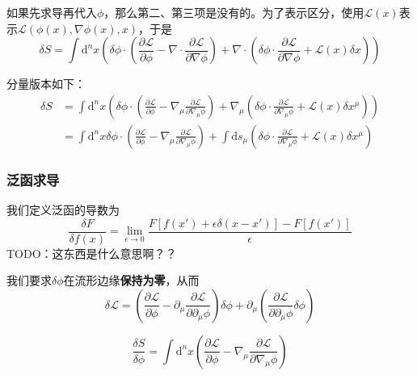 \documentclass[UTF8, a4paper]{ctexart}
\begin{document}
如果先求导再代入$\phi$，那么第二、第三项是没有的。为了表示区分，使用$\mathcal{L}(x)$表示$\mathcal{L}(\phi(x), \nabla \phi (x), x)$，于是
\begin{equation}
    \delta S = \int \mathrm{d}^n x \left( \delta \phi \cdot \left(\frac{\partial \mathcal{L}}{\partial \phi} - \nabla \cdot \frac{\partial \mathcal{L}}{\partial \nabla \phi} \right) + \nabla \cdot \left( \delta \phi \cdot \frac{\partial \mathcal{L}}{\partial \nabla \phi} + \mathcal{L}(x) \delta x \right) \right)
    \label{eq:variation-of-action}
\end{equation}

分量版本如下：
\begin{equation}
    \begin{aligned}
        \delta S &= \int \mathrm{d}^n x \left( \delta \phi \cdot \left ( \frac{\partial \mathcal{L}}{\partial \phi} - \nabla_\mu \frac{\partial \mathcal{L}}{\partial \nabla_\mu \phi} \right) + \nabla_\mu \left( \delta \phi \cdot \frac{\partial \mathcal{L}}{\partial \nabla_\mu \phi} + \mathcal{L}(x) \delta x^\mu\right) \right) \\
        &= \int \mathrm{d}^n x  \delta \phi \cdot \left ( \frac{\partial \mathcal{L}}{\partial \phi} - \nabla_\mu \frac{\partial \mathcal{L}}{\partial \nabla_\mu \phi} \right)
        + \int \mathrm{d}s_\mu \left( \delta \phi \cdot \frac{\partial \mathcal{L}}{\partial \nabla_\mu \phi} + \mathcal{L}(x) \delta x^\mu\right)
    \end{aligned}
\end{equation}

\subsubsection{泛函求导}
我们定义泛函的导数为
\begin{equation}
    \frac{\delta F}{\delta f(x)} = \lim_{\epsilon \to 0} \frac{F[f(x')+\epsilon \delta (x - x')] - F[f(x')]}{\epsilon}
    \label{eq:derivative-of-functional-def}
\end{equation}
TODO：这东西是什么意思啊？？

我们要求$\delta \phi$在流形边缘\textbf{保持为零}，从而
\[
\delta \mathcal{L} = \left( \frac{\partial \mathcal{L}}{\partial \phi} - \partial_\mu \frac{\partial \mathcal{L}}{\partial \partial_\mu \phi} \right) \delta \phi + \partial_\mu \left( \frac{\partial \mathcal{L}}{\partial \partial_\mu \phi} \delta \phi \right)
\]

\begin{equation}
    \frac{\delta S}{\delta \phi} = \int \mathrm{d}^nx \left(\frac{\partial \mathcal{L}}{\partial \phi} - \nabla_\mu \frac{\partial \mathcal{L}}{\partial \nabla_\mu \phi}\right)
    \label{eq:derivative-of-functional}
\end{equation}
\end{document}

